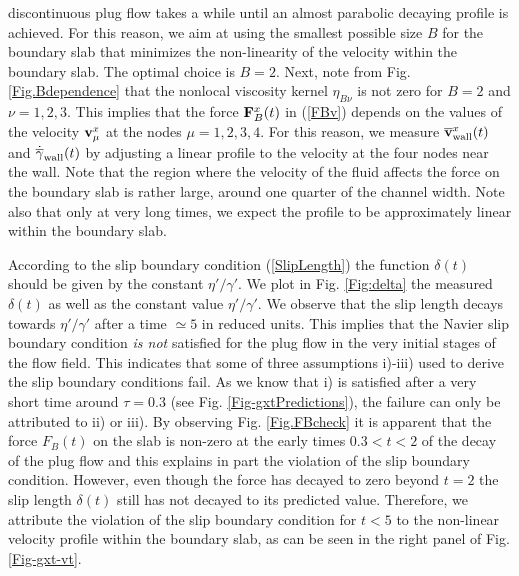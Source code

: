 \documentclass[b5paper,openright,10pt]{book}
\begin{document}
discontinuous  plug  flow takes  a  while  until an  almost  parabolic
decaying profile  is achieved.  For  this reason,  we aim at  using the
smallest possible  size $B$ for  the boundary slab that  minimizes the
non-linearity of  the velocity within  the boundary slab.   The optimal
choice is $B=2$.  Next, note from Fig.  \ref{Fig.Bdependence} that the
nonlocal viscosity  kernel $\eta_{B\nu}$  is not  zero for  $B=2$ and
$\nu=1,2,3$.   This  implies  that   the  force  ${\bf  F}^x_B(t)$  in
(\ref{FBv}) depends on  the values of the velocity  ${\bf v}^x_\mu$ at
the nodes  $\mu=1,2,3,4$.  For this reason,  we measure $\overline{\bf
  v}^x_{\rm wall}(t)$  and $\dot{\overline{\gamma}}_{\rm  wall}(t)$ by
adjusting a linear profile to the  velocity at the four nodes near the
wall.  Note  that the region where  the velocity of the  fluid affects
the force on the boundary slab  is rather large, around one quarter of
the channel width. Note also that only at very long  times, we expect the
profile to be approximately linear within the boundary slab.


According  to  the  slip  boundary  condition  (\ref{SlipLength})  the
function $\delta(t)$ should be  given by the constant $\eta'/\gamma'$.
We plot in  Fig.  \ref{Fig:delta} the measured $\delta(t)$  as well as
the constant value  $\eta'/\gamma'$.  We observe that  the slip length
decays  towards $\eta'/\gamma'$  after a  time $\simeq  5$ in  reduced
units.   This   implies  that  the  Navier   slip  boundary  condition
\textit{is not} satisfied for the plug flow in the very initial stages
of  the flow  field. This  indicates  that some  of three  assumptions
i)-iii) used to derive the slip  boundary conditions fail.  As we know
that i)  is satisfied after a  very short time around  $\tau=0.3$ (see
Fig.  \ref{Fig-gxtPredictions}), the failure can only be attributed to ii) or
iii).  By  observing Fig.  \ref{Fig.FBcheck}  it is apparent  that the
force $F_B(t)$ on the slab is non-zero at the early times $0.3<t<2$ of
the decay of the plug flow and  this explains in part the violation of
the  slip boundary  condition.   However, even  though  the force  has
decayed to zero beyond $t=2$ the slip length $\delta(t)$ still has not
decayed to its predicted value.  Therefore, we attribute the violation
of the  slip boundary condition  for $t<5$ to the  non-linear velocity
profile within the boundary slab, as can be seen in the right panel of Fig. \ref{Fig-gxt-vt}.
\end{document}

